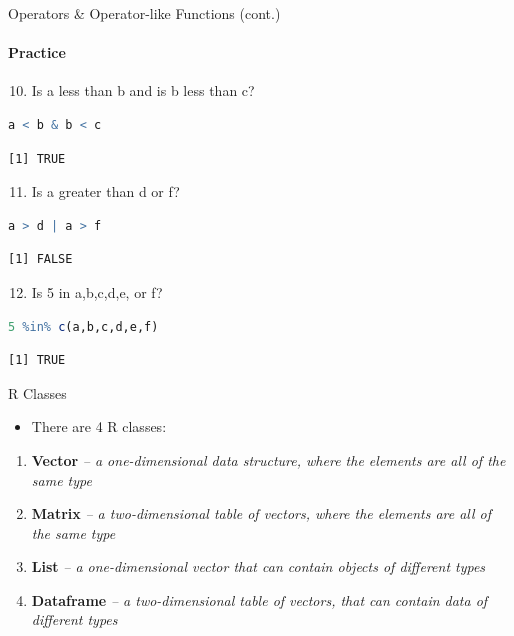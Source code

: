 \begin{frame}[fragile]{Operators \& Operator-like Functions (cont.)}
\framesubtitle{Practice}
\begin{enumerate}\setcounter{enumi}{9}
  \item Is a less than b and is b less than c?
\end{enumerate}
\begin{lstlisting}[language=R]
a < b & b < c
\end{lstlisting}
\begin{lstlisting}[style=output]
[1] TRUE
\end{lstlisting}
\begin{enumerate}\setcounter{enumi}{10}
  \item Is a greater than d or f?
\end{enumerate}
\begin{lstlisting}[language=R]
a > d | a > f
\end{lstlisting}
\begin{lstlisting}[style=output]
[1] FALSE
\end{lstlisting}
\begin{enumerate}\setcounter{enumi}{11}
  \item Is 5 in a,b,c,d,e, or f?
\end{enumerate}
\begin{lstlisting}[language=R]
5 %in% c(a,b,c,d,e,f)
\end{lstlisting}
\begin{lstlisting}[style=output]
[1] TRUE
\end{lstlisting}
\end{frame}

\begin{frame}{R Classes}
\begin{itemize}
  \item There are 4 R classes:
\end{itemize}
\begin{enumerate}
  \item \textbf{Vector} \textit{-- a one-dimensional data structure, where the elements are all of the same type}
  \item \textbf{Matrix} \textit{-- a two-dimensional table of vectors, where the elements are all of the same type}
  \item \textbf{List} \textit{-- a one-dimensional vector that can contain objects of different types}
  \item \textbf{Dataframe} \textit{-- a two-dimensional table of vectors, that can contain data of different types}
\end{enumerate}
\end{frame}

